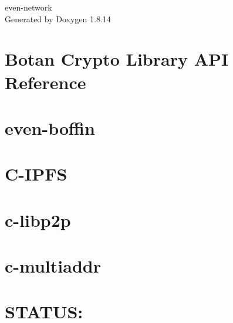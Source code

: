 \documentclass[twoside]{book}
\newcommand{\+}{\discretionary{\mbox{\scriptsize$\hookleftarrow$}}{}{}}
\newcommand{\clearemptydoublepage}{%
  \newpage{\pagestyle{empty}\cleardoublepage}%
}
\begin{document}
\hypersetup{pageanchor=false,
             bookmarksnumbered=true,
             pdfencoding=unicode
            }
\begin{titlepage}
\vspace*{7cm}
\begin{center}%
{\Large even-\/network }\\
\vspace*{1cm}
{\large Generated by Doxygen 1.8.14}\\
\end{center}
\end{titlepage}
\clearemptydoublepage
{}
\tableofcontents
\clearemptydoublepage
{}
\hypersetup{pageanchor=true}

\chapter{Botan Crypto Library A\+PI Reference}
\label{index}\hypertarget{index}{}
\chapter{even-\/boffin}
\label{md_even-boffin__r_e_a_d_m_e}

\chapter{C-\/\+I\+P\+FS}
\label{md_prerequisites_c-ipfs__r_e_a_d_m_e}

\chapter{c-\/libp2p}
\label{md_prerequisites_c-libp2p__r_e_a_d_m_e}

\chapter{c-\/multiaddr}
\label{md_prerequisites_c-multiaddr__r_e_a_d_m_e}

\chapter{S\+T\+A\+T\+US\+:}
\label{md_prerequisites_c-multiaddr__s_t_a_t_u_s}

\end{document}
